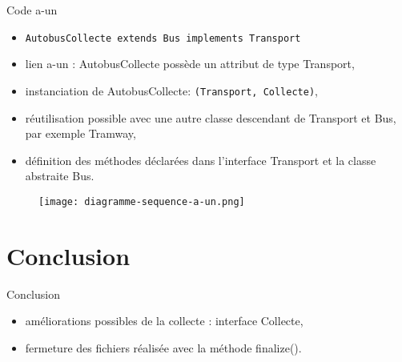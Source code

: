 \documentclass{beamer}
\begin{document}
\begin{frame}
\begin{center}
\begin{block}{Code a-un}
\begin{itemize}
\item \texttt{AutobusCollecte extends Bus implements Transport}
\item lien a-un : AutobusCollecte possède un attribut de type Transport,
\item instanciation de AutobusCollecte: \texttt{(Transport, Collecte)},
\item réutilisation possible avec une autre classe descendant de Transport et Bus, par exemple Tramway,
\item définition des méthodes déclarées dans l'interface Transport et la classe abstraite Bus.
\end{itemize}
\end{block}
\begin{figure}
\texttt{[image: diagramme-sequence-a-un.png]}
\end{figure}
\end{center}
\end{frame}

\section*{Conclusion}
\begin{frame}
\begin{block}{Conclusion}
\begin{center}
\begin{itemize}
\item améliorations possibles de la collecte : interface Collecte,
\item fermeture des fichiers réalisée avec la méthode finalize().
\end{itemize}
\end{center}
\end{block}
\end{frame}
\end{document}
